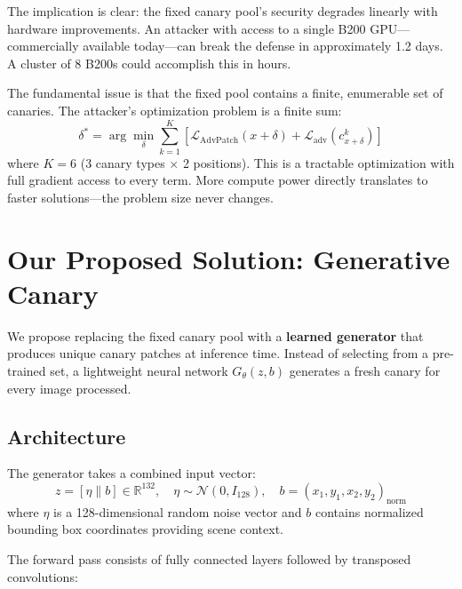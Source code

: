 \documentclass[11pt,a4paper]{article}
\begin{document}
The implication is clear: the fixed canary pool's security degrades linearly with hardware improvements. An attacker with access to a single B200 GPU---commercially available today---can break the defense in approximately 1.2 days. A cluster of 8 B200s could accomplish this in hours.

The fundamental issue is that the fixed pool contains a finite, enumerable set of canaries. The attacker's optimization problem is a finite sum:
\begin{equation}
    \delta^* = \arg\min_\delta \sum_{k=1}^{K} \left[ \mathcal{L}_{\text{AdvPatch}}(x + \delta) + \mathcal{L}_{\text{adv}}(c_{x+\delta}^k) \right]
\end{equation}
where $K=6$ (3 canary types $\times$ 2 positions). This is a tractable optimization with full gradient access to every term. More compute power directly translates to faster solutions---the problem size never changes.

\section{Our Proposed Solution: Generative Canary}

We propose replacing the fixed canary pool with a \textbf{learned generator} that produces unique canary patches at inference time. Instead of selecting from a pre-trained set, a lightweight neural network $G_\theta(z, b)$ generates a fresh canary for every image processed.

\subsection{Architecture}

The generator takes a combined input vector:
\begin{equation}
    z = [\eta \| b] \in \mathbb{R}^{132}, \quad \eta \sim \mathcal{N}(0, I_{128}), \quad b = (x_1, y_1, x_2, y_2)_{\text{norm}}
\end{equation}
where $\eta$ is a 128-dimensional random noise vector and $b$ contains normalized bounding box coordinates providing scene context.

The forward pass consists of fully connected layers followed by transposed convolutions:
\end{document}
